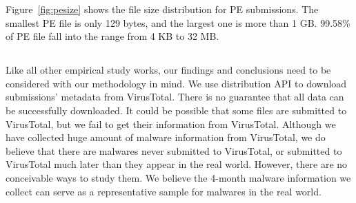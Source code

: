 

Figure~\ref{fig:pesize} shows the file size distribution for PE submissions. 
The smallest PE file is only 129 bytes, and the largest one is more than 1 GB. 
99.58\% of PE file fall into the range from 4 KB to 32 MB. 

\subsection{}

Like all other empirical study works, 
our findings and conclusions need to be considered with our methodology in mind. 
We use distribution API to download submissions' metadata from VirusTotal. 
There is no guarantee that all data can be successfully downloaded. 
It could be possible that some files are submitted to VirusTotal, 
but we fail to get their information from VirusTotal.
Although we have collected huge amount of malware information from VirusTotal,
we do believe that there are malwares never submitted to VirusTotal, 
or submitted to VirusTotal much later than they appear in the real world. 
However, there are no conceivable ways to study them.
We believe the 4-month malware information we collect can serve as a representative sample for malwares in the real world. 
